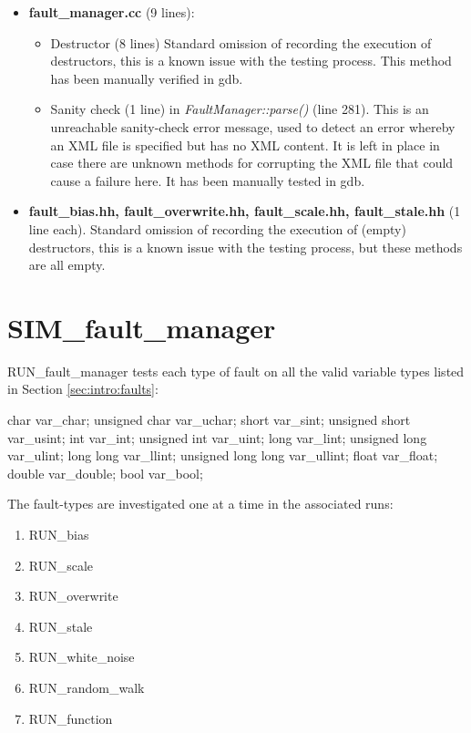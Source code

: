 \documentclass[11pt,fleqn]{report}
\begin{document}
\begin{itemize}
\begin{itemize}
         this may have been optimized out for the same reason as the previous
         false flag.
 \end{itemize}
 \item \textbf{fault\_manager.cc} (9 lines):
 \begin{itemize}
   \item Destructor (8 lines)
       Standard omission of recording the execution of destructors,
       this is a known issue with the testing process.  This method has been
       manually verified in gdb.
   \item Sanity check (1 line) in \textit{FaultManager::parse()} (line 281).
         This is
         an unreachable sanity-check error message, used to detect an error
         whereby an XML file is specified but has no XML content. It is left in
         place in case there are unknown methods for corrupting the XML file
         that could cause a failure here.
         It has been manually tested in gdb.
 \end{itemize}
 \item \textbf{fault\_bias.hh, fault\_overwrite.hh, fault\_scale.hh,
       fault\_stale.hh} (1 line each).
       Standard omission of recording the execution of (empty) destructors,
       this is a known issue with the testing process, but these methods are all
       empty.
\end{itemize}



\section{SIM\_fault\_manager} \label{sec:verif:FM}
\par RUN\_fault\_manager tests each type of fault on all the valid variable
types listed in Section \ref{sec:intro:faults}:
\begin{codeC}
char               var_char;
unsigned char      var_uchar;
short              var_sint;
unsigned short     var_usint;
int                var_int;
unsigned int       var_uint;
long               var_lint;
unsigned long      var_ulint;
long long          var_llint;
unsigned long long var_ullint;
float              var_float;
double             var_double;
bool               var_bool;
\end{codeC}

The fault-types are investigated one at a time in the associated runs:
\begin{enumerate}
\item RUN\_bias
\item RUN\_scale
\item RUN\_overwrite
\item RUN\_stale
\item RUN\_white\_noise
\item RUN\_random\_walk
\item RUN\_function
\end{enumerate}
\end{document}
